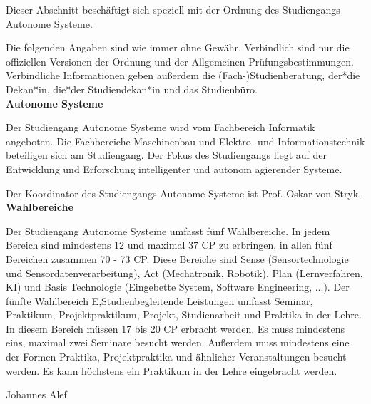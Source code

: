 {Dieser Abschnitt beschäftigt sich speziell mit der Ordnung des Studiengangs Autonome Systeme.
}{
    Die folgenden Angaben sind wie immer ohne Gewähr. Verbindlich sind nur die offiziellen Versionen der Ordnung und der Allgemeinen Prüfungsbestimmungen. Verbindliche Informationen geben außerdem die (Fach-)Studienberatung, der*die Dekan*in, die*der Studiendekan*in und das Studienbüro.\\

    \noindent\textbf{Autonome Systeme}

    Der Studiengang Autonome Systeme wird vom Fachbereich Informatik angeboten. Die Fachbereiche Maschinenbau und Elektro- und Informationstechnik beteiligen sich am Studiengang. Der Fokus des Studiengangs liegt auf der Entwicklung und Erforschung intelligenter und autonom agierender Systeme.

    Der Koordinator des Studiengangs Autonome Systeme ist Prof. Oskar von Stryk.\\

    \noindent\textbf{Wahlbereiche}

    Der Studiengang Autonome Systeme umfasst fünf Wahlbereiche. In jedem Bereich sind mindestens 12 und maximal 37 CP zu erbringen, in allen fünf Bereichen zusammen 70 - 73 CP. Diese Bereiche sind Sense (Sensortechnologie und Sensordatenverarbeitung), Act (Mechatronik, Robotik), Plan (Lernverfahren, KI) und Basis Technologie (Eingebette System, Software Engineering, ...). Der fünfte Wahlbereich E,Studienbegleitende Leistungen umfasst Seminar, Praktikum, Projektpraktikum, Projekt, Studienarbeit und Praktika in der Lehre. In diesem Bereich müssen 17 bis 20 CP erbracht werden. Es muss mindestens eins, maximal zwei Seminare besucht werden. Außerdem muss mindestens eine der Formen Praktika, Projektpraktika und ähnlicher Veranstaltungen besucht werden. Es kann höchstens ein Praktikum in der Lehre eingebracht werden.\\

}
{Johannes Alef}
